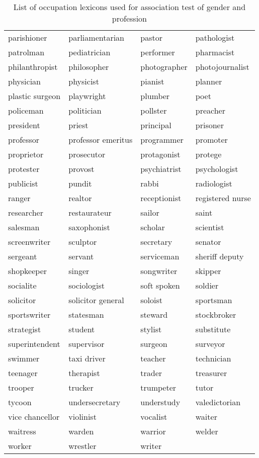 \documentclass[11pt]{article}
\begin{document}
\begin{table}[t]
    \centering
    \begin{tabular}{l l l l}
    \toprule
        parishioner & parliamentarian & pastor & pathologist \\
        patrolman & pediatrician & performer & pharmacist \\
        philanthropist & philosopher & photographer & photojournalist \\
        physician & physicist & pianist & planner \\
        plastic surgeon & playwright & plumber & poet \\
        policeman & politician & pollster & preacher \\
        president & priest & principal & prisoner \\
        professor & professor emeritus & programmer & promoter \\
        proprietor & prosecutor & protagonist & protege \\
        protester & provost & psychiatrist & psychologist \\
        publicist & pundit & rabbi & radiologist \\
        ranger & realtor & receptionist & registered nurse \\
        researcher & restaurateur & sailor & saint \\
        salesman & saxophonist & scholar & scientist \\
        screenwriter & sculptor & secretary & senator \\
        sergeant & servant & serviceman & sheriff deputy \\
        shopkeeper & singer & songwriter & skipper \\
        socialite & sociologist & soft spoken & soldier \\
        solicitor & solicitor general & soloist & sportsman \\
        sportswriter & statesman & steward & stockbroker \\
        strategist & student & stylist & substitute \\
        superintendent & supervisor & surgeon & surveyor \\
        swimmer & taxi driver & teacher & technician \\
        teenager & therapist & trader & treasurer \\
        trooper & trucker & trumpeter & tutor \\
        tycoon & undersecretary & understudy & valedictorian \\
        vice chancellor & violinist & vocalist & waiter \\
        waitress & warden & warrior & welder \\
        worker & wrestler & writer &  \\
    \bottomrule
    \end{tabular}
    \caption{List of occupation lexicons used for association test of gender and profession}
    \label{tab:occ2}
\end{table}
\end{document}
